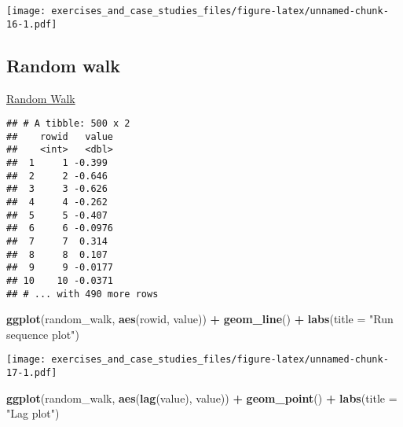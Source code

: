 \documentclass[]{book}
\newenvironment{Shaded}{\begin{snugshade}}{\end{snugshade}}
\newcommand{\DataTypeTok}[1]{\textcolor[rgb]{0.13,0.29,0.53}{#1}}
\newcommand{\DecValTok}[1]{\textcolor[rgb]{0.00,0.00,0.81}{#1}}
\newcommand{\KeywordTok}[1]{\textcolor[rgb]{0.13,0.29,0.53}{\textbf{#1}}}
\newcommand{\NormalTok}[1]{#1}
\newcommand{\OperatorTok}[1]{\textcolor[rgb]{0.81,0.36,0.00}{\textbf{#1}}}
\newcommand{\StringTok}[1]{\textcolor[rgb]{0.31,0.60,0.02}{#1}}
\theoremstyle{definition}
\theoremstyle{definition}
\theoremstyle{definition}
\theoremstyle{remark}
\begin{document}
\texttt{[image: exercises\_and\_case\_studies\_files/figure-latex/unnamed-chunk-16-1.pdf]}

\hypertarget{random-walk}{%
\subsection{Random walk}\label{random-walk}}

\href{https://www.itl.nist.gov/div898/handbook/eda/section4/eda4231.htm}{Random
Walk}

\begin{Shaded}
\end{Shaded}

\begin{verbatim}
## # A tibble: 500 x 2
##    rowid   value
##    <int>   <dbl>
##  1     1 -0.399 
##  2     2 -0.646 
##  3     3 -0.626 
##  4     4 -0.262 
##  5     5 -0.407 
##  6     6 -0.0976
##  7     7  0.314 
##  8     8  0.107 
##  9     9 -0.0177
## 10    10 -0.0371
## # ... with 490 more rows
\end{verbatim}

\begin{Shaded}
\begin{Highlighting}[]
\KeywordTok{ggplot}\NormalTok{(random_walk, }\KeywordTok{aes}\NormalTok{(rowid, value)) }\OperatorTok{+}
\StringTok{  }\KeywordTok{geom_line}\NormalTok{() }\OperatorTok{+}
\StringTok{  }\KeywordTok{labs}\NormalTok{(}\DataTypeTok{title =} \StringTok{"Run sequence plot"}\NormalTok{)}
\end{Highlighting}
\end{Shaded}

\texttt{[image: exercises\_and\_case\_studies\_files/figure-latex/unnamed-chunk-17-1.pdf]}

\begin{Shaded}
\begin{Highlighting}[]
\KeywordTok{ggplot}\NormalTok{(random_walk, }\KeywordTok{aes}\NormalTok{(}\KeywordTok{lag}\NormalTok{(value), value)) }\OperatorTok{+}
\StringTok{  }\KeywordTok{geom_point}\NormalTok{() }\OperatorTok{+}
\StringTok{  }\KeywordTok{labs}\NormalTok{(}\DataTypeTok{title =} \StringTok{"Lag plot"}\NormalTok{)}
\end{Highlighting}
\end{Shaded}
\end{document}
